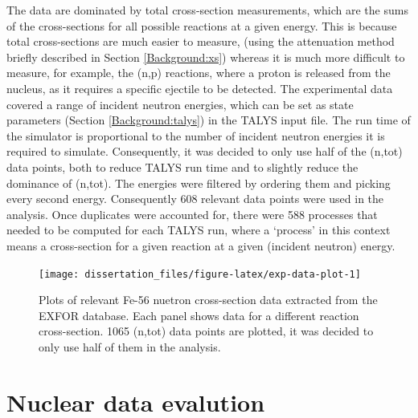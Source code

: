\documentclass[
  12pt,
  a4paper,
  twoside]{book}
\begin{document}
The data are dominated by total cross-section measurements, which are the sums of the cross-sections for all possible reactions at a given energy. This is because total cross-sections are much easier to measure, (using the attenuation method briefly described in Section \ref{Background:xs}) whereas it is much more difficult to measure, for example, the (n,p) reactions, where a proton is released from the nucleus, as it requires a specific ejectile to be detected. The experimental data covered a range of incident neutron energies, which can be set as state parameters (Section \ref{Background:talys}) in the TALYS input file. The run time of the simulator is proportional to the number of incident neutron energies it is required to simulate. Consequently, it was decided to only use half of the (n,tot) data points, both to reduce TALYS run time and to slightly reduce the dominance of (n,tot). The energies were filtered by ordering them and picking every second energy. Consequently 608 relevant data points were used in the analysis. Once duplicates were accounted for, there were 588 processes that needed to be computed for each TALYS run, where a `process' in this context means a cross-section for a given reaction at a given (incident neutron) energy.

\begin{figure}[H]

{\centering \texttt{[image: dissertation\_files/figure-latex/exp-data-plot-1]} 

}

\caption{Plots of relevant Fe-56 nuetron cross-section data extracted from the EXFOR database. Each panel shows data for a different reaction cross-section. 1065 (n,tot) data points are plotted, it was decided to only use half of them in the analysis.}\label{fig:exp-data-plot}
\end{figure}

\hypertarget{Background:evaluation}{%
\section{Nuclear data evalution}\label{Background:evaluation}}
\end{document}
